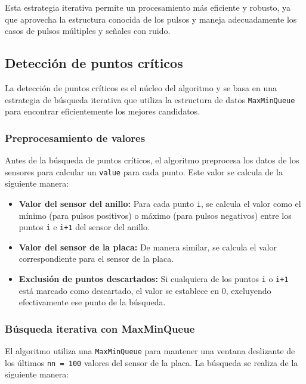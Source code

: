 \documentclass[12pt,a4paper]{article}
\begin{document}
Esta estrategia iterativa permite un procesamiento más eficiente y robusto, ya que aprovecha la estructura conocida de los pulsos y maneja adecuadamente los casos de pulsos múltiples y señales con ruido.

\subsection{Detección de puntos críticos}

La detección de puntos críticos es el núcleo del algoritmo y se basa en una estrategia de búsqueda iterativa que utiliza la estructura de datos \texttt{MaxMinQueue} para encontrar eficientemente los mejores candidatos.

\subsubsection{Preprocesamiento de valores}

Antes de la búsqueda de puntos críticos, el algoritmo preprocesa los datos de los sensores para calcular un \texttt{value} para cada punto. Este valor se calcula de la siguiente manera:

\begin{itemize}
    \item \textbf{Valor del sensor del anillo:} Para cada punto \texttt{i}, se calcula el valor como el mínimo (para pulsos positivos) o máximo (para pulsos negativos) entre los puntos \texttt{i} e \texttt{i+1} del sensor del anillo.
    
    \item \textbf{Valor del sensor de la placa:} De manera similar, se calcula el valor correspondiente para el sensor de la placa.
    
    \item \textbf{Exclusión de puntos descartados:} Si cualquiera de los puntos \texttt{i} o \texttt{i+1} está marcado como descartado, el valor se establece en 0, excluyendo efectivamente ese punto de la búsqueda.
\end{itemize}

\subsubsection{Búsqueda iterativa con MaxMinQueue}

El algoritmo utiliza una \texttt{MaxMinQueue} para mantener una ventana deslizante de los últimos \texttt{nn = 100} valores del sensor de la placa. La búsqueda se realiza de la siguiente manera:
\end{document}
